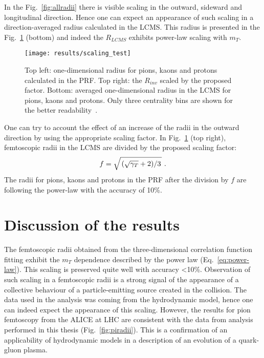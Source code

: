       In the Fig.~\ref{fig:allradii} there is visible scaling in the outward, sideward and longitudinal direction.
      Hence one can expect an appearance of such scaling in a direction-averaged radius calculated in the LCMS.
      This radius is presented in the Fig.~\ref{fig:scaling_test} (bottom) and indeed the $R_{LCMS}$ exhibits power-law scaling with $m_T$.

      \begin{figure}[b]
        \centering
        \centerline{\texttt{[image: results/scaling\_test]}}
        \caption{Top left: one-dimensional radius for pions, kaons and protons calculated in the PRF. Top right: the $R_{inv}$ scaled by the proposed factor. Bottom: averaged one-dimensional radius in the LCMS for pions, kaons and protons. Only three centrality bins are shown for the better readability~\cite{galazyn}.}
      \label{fig:scaling_test}
      \end{figure}

      One can try to account the effect of an increase of the radii in the outward direction by using the appropriate scaling factor.
      In Fig.~\ref{fig:scaling_test} (top right), femtoscopic radii in the LCMS are divided by the proposed scaling factor:
      \begin{equation}
        f = \sqrt{ \left. \left( \sqrt{\gamma_T} + 2 \right) \middle/ 3 \right. }~.
      \end{equation}
      The radii for pions, kaons and protons in the PRF after the division by $f$ are following the power-law with the accuracy of 10\%.



      \FloatBarrier
  \section{Discussion of the results}
    The femtoscopic radii obtained from the three-dimensional correlation function fitting exhibit the $m_T$ dependence described by the power law (Eq.~\ref{eq:power-law}).
    This scaling is preserved quite well with accuracy <10\%.
    Observation of such scaling in a femtoscopic radii is a strong signal of the appearance of a collective behaviour of a particle-emitting source created in the collision.
    The data used in the analysis was coming from the hydrodynamic model, hence one can indeed expect the appearance of this scaling.
    However, the results for pion femtoscopy from the ALICE at LHC are consistent with the data from analysis performed in this thesis (Fig.~\ref{fig:piradii}).
    This is a confirmation of an applicability of hydrodynamic models in a description of an evolution of a quark-gluon plasma.

